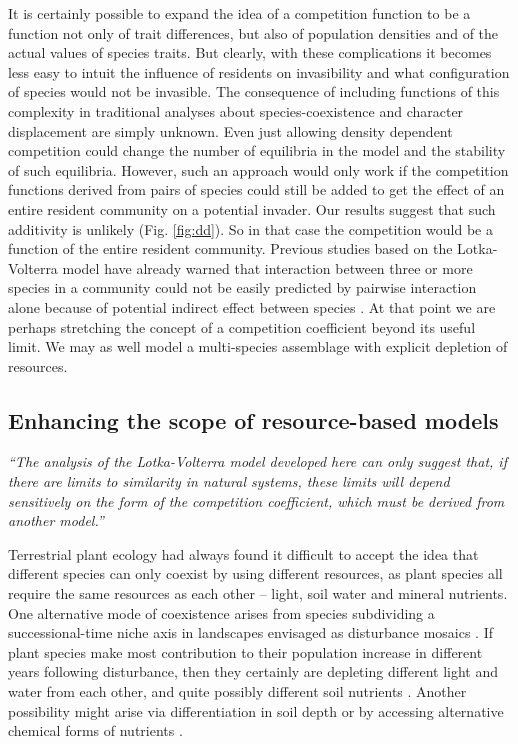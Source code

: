 \documentclass[a4paper,11pt]{article}
\begin{document}
It is certainly possible to expand the idea of a competition function to
be a function not only of trait differences, but also of population
densities and of the actual values of species traits. But clearly, with these complications it becomes less easy to intuit the influence of residents on invasibility and what configuration of species would not be invasible. The consequence of including functions of
this complexity in traditional analyses about species-coexistence and
character displacement are simply unknown.  Even just allowing density
dependent competition could change the number of equilibria in the
model and the stability of such equilibria.
%
However, such an approach would only work if the competition functions
derived from pairs of species could still be added to get the effect
of an entire resident community on a potential invader.
%
Our results suggest that such additivity is unlikely
(Fig. \ref{fig:dd}). %
 So in that case the competition would be a
function of the entire resident community. Previous studies based on the Lotka-Volterra model have already warned that interaction between three or more species in a community could not be easily predicted by pairwise interaction alone because of potential indirect effect between species \citep{Levine-1976}.
 At that point we are
perhaps stretching the concept of a competition coefficient
beyond its useful limit. We may as well
model a multi-species assemblage with explicit depletion of resources.

\subsection{Enhancing the scope of resource-based models}

\emph{``The analysis of the Lotka-Volterra model developed here can only
suggest that, if there are limits to similarity in natural systems, these
limits will depend sensitively on the form of the competition coefficient,
which must be derived from another model.''}\citep{Abrams-1975}

Terrestrial plant ecology had always found it difficult to accept the
idea that different species can only coexist by using different
resources, as plant species all require the same resources as each other --
light, soil water and mineral nutrients. One alternative mode of coexistence
arises from species subdividing a successional-time niche axis in
landscapes envisaged as disturbance mosaics \citep{Connell-1978}. If
plant species make most contribution to their population increase in
different years following disturbance, then they certainly are
depleting different light and water from each other, and quite
possibly different soil nutrients \citep{Moorcroft-2001}. Another
possibility might arise via differentiation in soil depth or by accessing
alternative chemical forms of nutrients \citep{Tilman-1977}.
\end{document}

